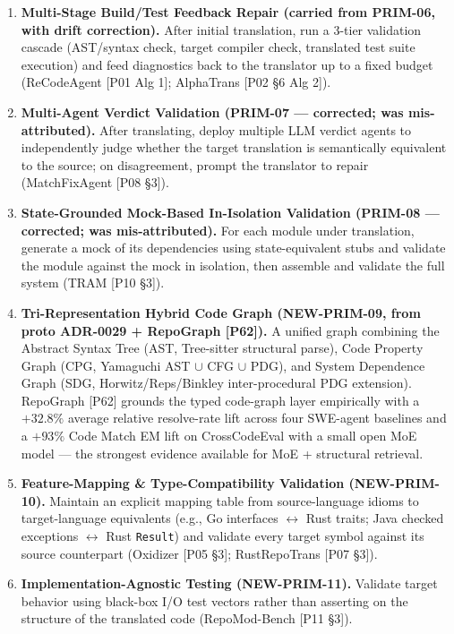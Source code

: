 \begin{enumerate}
\item \textbf{Multi-Stage Build/Test Feedback Repair (carried from PRIM-06, with drift correction).}
After initial translation, run a 3-tier validation cascade (AST/syntax check, target compiler check, translated test suite execution) and feed diagnostics back to the translator up to a fixed budget (ReCodeAgent [P01 Alg 1]; AlphaTrans [P02 \S6 Alg 2]).

\item \textbf{Multi-Agent Verdict Validation (PRIM-07 --- corrected; was mis-attributed).}
After translating, deploy multiple LLM verdict agents to independently judge whether the target translation is semantically equivalent to the source; on disagreement, prompt the translator to repair (MatchFixAgent [P08 \S3]).

\item \textbf{State-Grounded Mock-Based In-Isolation Validation (PRIM-08 --- corrected; was mis-attributed).}
For each module under translation, generate a mock of its dependencies using state-equivalent stubs and validate the module against the mock in isolation, then assemble and validate the full system (TRAM [P10 \S3]).

\item \textbf{Tri-Representation Hybrid Code Graph (NEW-PRIM-09, from proto ADR-0029 + RepoGraph [P62]).}
A unified graph combining the Abstract Syntax Tree (AST, Tree-sitter structural parse), Code Property Graph (CPG, Yamaguchi AST $\cup$ CFG $\cup$ PDG), and System Dependence Graph (SDG, Horwitz/Reps/Binkley inter-procedural PDG extension). RepoGraph [P62] grounds the typed code-graph layer empirically with a $+32.8\%$ average relative resolve-rate lift across four SWE-agent baselines and a $+93\%$ Code Match EM lift on CrossCodeEval with a small open MoE model --- the strongest evidence available for MoE + structural retrieval.

\item \textbf{Feature-Mapping \& Type-Compatibility Validation (NEW-PRIM-10).}
Maintain an explicit mapping table from source-language idioms to target-language equivalents (e.g., Go interfaces $\leftrightarrow$ Rust traits; Java checked exceptions $\leftrightarrow$ Rust \texttt{Result}) and validate every target symbol against its source counterpart (Oxidizer [P05 \S3]; RustRepoTrans [P07 \S3]).

\item \textbf{Implementation-Agnostic Testing (NEW-PRIM-11).}
Validate target behavior using black-box I/O test vectors rather than asserting on the structure of the translated code (RepoMod-Bench [P11 \S3]).


\end{enumerate}

